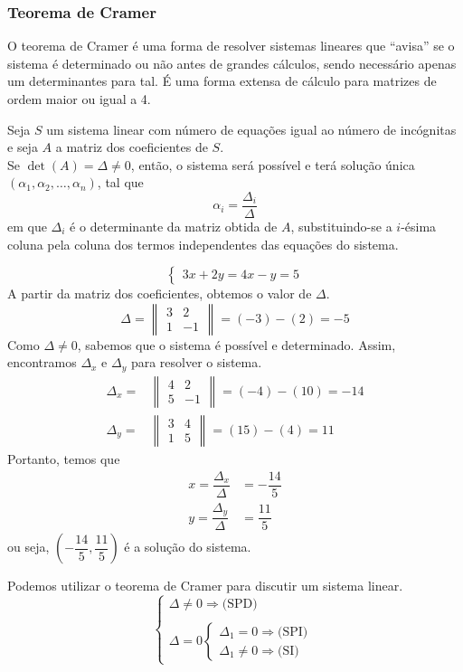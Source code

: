\subsubsection{Teorema de Cramer\cite{fme4}}
O teorema de Cramer é uma forma de resolver sistemas lineares que ``avisa'' se o sistema é determinado ou não antes de grandes cálculos, sendo necessário apenas um determinantes para tal. É uma forma extensa de cálculo para matrizes de ordem maior ou igual a 4.
\begin{teo}
Seja $S$ um sistema linear com número de equações igual ao número de incógnitas e seja $A$ a matriz dos coeficientes de $S$. \\ Se $\det(A)=\Delta\neq 0$, então, o sistema será possível e terá solução única $(\alpha_1,\alpha_2,\dots,\alpha_n)$, tal que
\[\alpha_i= \dfrac{\Delta_i}{\Delta}\]
em que $\Delta_i$ é o determinante da matriz obtida de $A$, substituindo-se a $i$-ésima coluna pela coluna dos termos independentes das equações do sistema.
\end{teo}
\begin{exemplo}
\[\begin{cases}
3x+2y=4
x-y=5
\end{cases}\]
A partir da matriz dos coeficientes, obtemos o valor de $\Delta$.
\[\Delta=\begin{Vmatrix}
3 & 2 \\
1 & -1
\end{Vmatrix}=(-3) - (2)=-5\]
Como $\Delta \neq 0$, sabemos que o sistema é possível e determinado. Assim, encontramos $\Delta_x$ e $\Delta_y$ para resolver o sistema.
\begin{align*}
\Delta_x=&\begin{Vmatrix}
4 & 2 \\
5 & -1
\end{Vmatrix}=(-4)-(10)=-14 \\
\Delta_y=&\begin{Vmatrix}
3 & 4 \\
1 & 5
\end{Vmatrix}=(15)-(4)=11
\end{align*}
Portanto, temos que
\begin{align*}
x=\dfrac{\Delta_x}{\Delta}&=-\dfrac{14}{5}\\
y=\dfrac{\Delta_y}{\Delta}&=\dfrac{11}{5}
\end{align*}
ou seja, $\left(-\dfrac{14}{5},\dfrac{11}{5}\right)$ é a solução do sistema.
\end{exemplo}
Podemos utilizar o teorema de Cramer para discutir um sistema linear. 
\[\begin{cases}
\Delta \neq 0 \Rightarrow \textrm{(SPD)}\\
\\
\Delta = 0 \begin{cases}
\Delta_1=0 \Rightarrow \textrm{(SPI)}\\
\Delta_1 \neq 0 \Rightarrow \textrm{(SI)}
\end{cases}
\end{cases}\]

